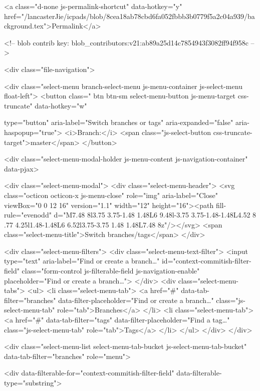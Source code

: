    
  <a class="d-none js-permalink-shortcut" data-hotkey="y" href="/lancasterJie/icpads/blob/8cea18ab78cbd6fa052fbbb3b0779f5a2c04a939/background.tex">Permalink</a>

  <!-- blob contrib key: blob_contributors:v21:ab89a25d14c7854943f3082ff94f958c -->

  <div class="file-navigation">
    
<div class="select-menu branch-select-menu js-menu-container js-select-menu float-left">
  <button class=" btn btn-sm select-menu-button js-menu-target css-truncate" data-hotkey="w"
    
    type="button" aria-label="Switch branches or tags" aria-expanded="false" aria-haspopup="true">
      <i>Branch:</i>
      <span class="js-select-button css-truncate-target">master</span>
  </button>

  <div class="select-menu-modal-holder js-menu-content js-navigation-container" data-pjax>

    <div class="select-menu-modal">
      <div class="select-menu-header">
        <svg class="octicon octicon-x js-menu-close" role="img" aria-label="Close" viewBox="0 0 12 16" version="1.1" width="12" height="16"><path fill-rule="evenodd" d="M7.48 8l3.75 3.75-1.48 1.48L6 9.48l-3.75 3.75-1.48-1.48L4.52 8 .77 4.25l1.48-1.48L6 6.52l3.75-3.75 1.48 1.48L7.48 8z"/></svg>
        <span class="select-menu-title">Switch branches/tags</span>
      </div>

      <div class="select-menu-filters">
        <div class="select-menu-text-filter">
          <input type="text" aria-label="Find or create a branch…" id="context-commitish-filter-field" class="form-control js-filterable-field js-navigation-enable" placeholder="Find or create a branch…">
        </div>
        <div class="select-menu-tabs">
          <ul>
            <li class="select-menu-tab">
              <a href="#" data-tab-filter="branches" data-filter-placeholder="Find or create a branch…" class="js-select-menu-tab" role="tab">Branches</a>
            </li>
            <li class="select-menu-tab">
              <a href="#" data-tab-filter="tags" data-filter-placeholder="Find a tag…" class="js-select-menu-tab" role="tab">Tags</a>
            </li>
          </ul>
        </div>
      </div>

      <div class="select-menu-list select-menu-tab-bucket js-select-menu-tab-bucket" data-tab-filter="branches" role="menu">

        <div data-filterable-for="context-commitish-filter-field" data-filterable-type="substring">


